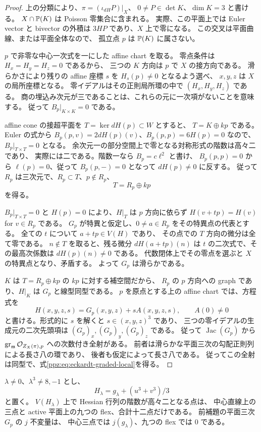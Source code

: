 \begin{proof}
上の分類により、$\pi=(\iota_{dH}P)|_X$、
$0\ne P\in\det K$、$\dim K=3$ と書ける。
$X\cap\mathbb P(K)$ は Poisson 零集合に含まれる。
実際、この平面上では Euler vector と bivector の外積は
$3H P$ であり、$X$ 上で零になる。
この交叉は平面曲線、または平面全体なので、
孤立点 $p$ は $\mathbb P(K)$ に属さない。

$p$ で非零な中心一次式を一にした affine chart を取る。
零点条件は $H_x=H_y=H_z=0$ であるから、
三つの $K$ 方向は $p$ で $X$ の接方向である。
滑らかさにより残りの affine 座標 $s$ を $H_s(p)\ne0$ となるよう選べ、
$x,y,z$ は $X$ の局所座標となる。
零イデアルはその正則局所環の中で $(H_x,H_y,H_z)$ である。
商の埋込み次元が三であることは、これらの元に一次項がないことを意味する。
従って $B_p|_{K\times K}=0$ である。

affine cone の接超平面を $T=\ker dH(p)\subset W$ とすると、
$T=K\oplus kp$ である。
Euler の式から $B_p(p,v)=2dH(p)(v)$、$B_p(p,p)=6H(p)=0$ なので、
$B_p|_{T\times T}=0$ となる。
余次元一の部分空間上で零となる対称形式の階数は高々二であり、
実際には二である。階数一なら $B_p=c\ell^2$ と書け、
$B_p(p,p)=0$ から $\ell(p)=0$、従って
$B_p(p,-)=0$ となって $dH(p)\ne0$ に反する。
従って $R_p$ は三次元で、$R_p\subset T$、$p\notin R_p$、
\[
 T=R_p\oplus kp
\]
を得る。

$B_p|_{T\times T}=0$ と $H(p)=0$ により、$H|_T$ は $p$ 方向に依らず
$H(v+tp)=H(v)$ for $v\in R_p$ である。
$G_p$ が特異と仮定し、$0\ne a\in R_p$ をその特異点の代表とする。
全ての $t$ について $a+tp\in V(H)$ であり、
その点での $T$ 方向の微分は全て零である。
$n\notin T$ を取ると、残る微分
$dH(a+tp)(n)$ は $t$ の二次式で、その最高次係数は
$dH(p)(n)\ne0$ である。
代数閉体上でその零点を選ぶと $X$ の特異点となり、矛盾する。
よって $G_p$ は滑らかである。

$K$ は $T=R_p\oplus kp$ の $kp$ に対する補空間だから、
$R_p$ の $p$ 方向への graph であり、$H|_K$ は $G_p$ と線型同型である。
$p$ を原点とする上の affine chart では、方程式を
\[
 H(x,y,z,s)=G_p(x,y,z)+sA(x,y,z,s),\qquad A(0)\ne0
\]
と書ける。形式的に $s$ を解くと $s\in(x,y,z)^3$ であり、
三つの零イデアルの生成元の二次先頭項は
$(G_p)_x,(G_p)_y,(G_p)_z$ である。
従って $\operatorname{Jac}(G_p)$ から
$\operatorname{gr}_{\mathfrak m}\mathcal O_{Z_X(\pi),p}$ への次数付き全射がある。
前者は滑らかな平面三次の勾配正則列による長さ八の環であり、
後者も仮定によって長さ八である。
従ってこの全射は同型で、式\eqref{ppz:eq:eckardt-graded-local}を得る。
\end{proof}

\begin{lemma}
\label{ppz:lem:hesse-eckardt}
$\lambda\ne0$、$\lambda^3\ne8,-1$ とし、
\[
 H_\lambda=g_\lambda+(u^3+v^3)/3
\]
と置く。
$V(H_\lambda)$ 上で Hessian 行列の階数が高々二となる点は、
中心直線上の三点と active 平面上の九つの flex、合計十二点だけである。
前補題の平面三次 $G_p$ の $j$ 不変量は、
中心三点では $j(g_\lambda)$、九つの flex では $0$ である。
\end{lemma}


